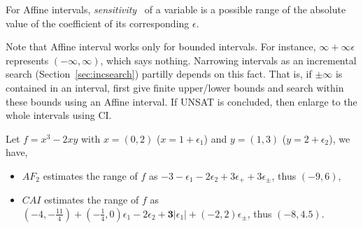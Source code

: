 \documentclass[runningheads,a4paper,oribibl]{llncs}
\begin{document}
\begin{remark}
For Affine intervals, \emph{sensitivity}~\cite{ngocsefm} of a variable
is a possible range of the absolute value of the coefficient of its corresponding $\epsilon$. 


Note that Affine interval works only for bounded intervals. 
For instance, $\infty + \infty \epsilon$ represents $(-\infty,\infty)$, which says nothing. 
Narrowing intervals as an incremental search (Section~\ref{sec:incsearch}) partilly depends on this fact. 
That is, if $\pm \infty$ is contained in an interval, first give finite upper/lower bounds and search 
within these bounds using an Affine interval. If UNSAT is concluded, then enlarge to the whole intervals 
using CI. 
\end{remark}

\begin{example} \label{examp:sensitivity}
Let $f = x^3 - 2xy$ with $x = (0,2)$ ($x = 1 + \epsilon_1$) and $y=(1,3)$ ($y = 2+\epsilon_2$), 
we have,
\end{example}
\begin{itemize}
\item $AF_2$ estimates the range of $f$ as 
$-3 - \epsilon_1 - 2\epsilon_2 + 3\epsilon_+ + 3\epsilon_{\pm}$, thus $(-9,6)$,
\item $CAI$ estimates the range of $f$ as 
$(-4,-\frac{11}{4}) + (-\frac{1}{4}, 0)\epsilon_1 - 2\epsilon_2 + \textbf{3}|\epsilon_1| + (-2,2)\epsilon_{\pm}$, 
thus $(-8,4.5)$.
\end{itemize}
\end{document}

